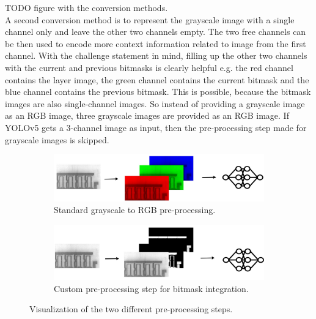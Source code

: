 TODO figure with the conversion methods. \\

A second conversion method is to represent the grayscale image with a single channel only and leave the other two channels empty. The two free channels can be then used to encode more context information related to image from the first channel. With the challenge statement in mind, filling up the other two channels with the current and previous bitmasks is clearly helpful e.g. the red channel contains the layer image, the green channel contains the current bitmask and the blue channel contains the previous bitmask. This is possible, because the bitmask images are also single-channel images. So instead of providing a grayscale image as an RGB image, three grayscale images are provided as an RGB image. If YOLOv5 gets a 3-channel image as input, then the pre-processing step made for grayscale images is skipped. \\

\begin{figure}[!h]
\centering
\begin{subfigure}{\textwidth}
  \centering
  \includegraphics[width=\linewidth]{images/implementation/gray_to_rgb}
  \caption{Standard grayscale to RGB pre-processing.}
\end{subfigure}

\begin{subfigure}{\textwidth}
  \centering
  \includegraphics[width=\linewidth]{images/implementation/gray_to_bm}
  \caption{Custom pre-processing step for bitmask integration.}
\end{subfigure}
\caption{Visualization of the two different pre-processing steps.}
\label{}
\end{figure}


